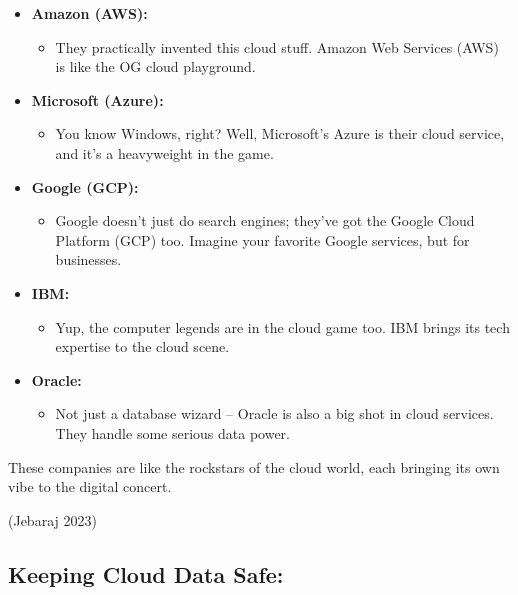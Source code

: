 \documentclass[
  letterpaper,
  DIV=11,
  numbers=noendperiod]{scrreprt}
\providecommand{\tightlist}{%
  \setlength{\itemsep}{0pt}\setlength{\parskip}{0pt}}\usepackage{longtable,booktabs,array}
\begin{document}
\begin{itemize}
\item
  \textbf{Amazon (AWS):}

  \begin{itemize}
  \tightlist
  \item
    They practically invented this cloud stuff. Amazon Web Services
    (AWS) is like the OG cloud playground.
  \end{itemize}
\item
  \textbf{Microsoft (Azure):}

  \begin{itemize}
  \tightlist
  \item
    You know Windows, right? Well, Microsoft's Azure is their cloud
    service, and it's a heavyweight in the game.
  \end{itemize}
\item
  \textbf{Google (GCP):}

  \begin{itemize}
  \tightlist
  \item
    Google doesn't just do search engines; they've got the Google Cloud
    Platform (GCP) too. Imagine your favorite Google services, but for
    businesses.
  \end{itemize}
\item
  \textbf{IBM:}

  \begin{itemize}
  \tightlist
  \item
    Yup, the computer legends are in the cloud game too. IBM brings its
    tech expertise to the cloud scene.
  \end{itemize}
\item
  \textbf{Oracle:}

  \begin{itemize}
  \tightlist
  \item
    Not just a database wizard -- Oracle is also a big shot in cloud
    services. They handle some serious data power.
  \end{itemize}
\end{itemize}

These companies are like the rockstars of the cloud world, each bringing
its own vibe to the digital concert.

(Jebaraj 2023)

\subsection{Keeping Cloud Data Safe:}\label{keeping-cloud-data-safe}
\end{document}
